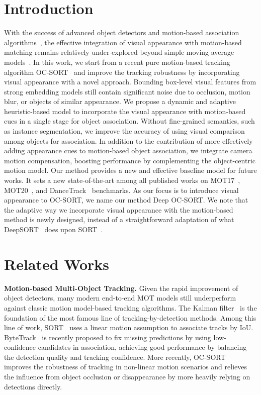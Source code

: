 \documentclass{article}
\begin{document}
\section{Introduction}
\label{sec:intro}
\vspace{-0.2cm}
With the success of advanced object detectors and motion-based association algorithms~\cite{bytetrack, cao2022observation, botsort}, the effective integration of visual appearance with motion-based matching remains relatively under-explored beyond simple moving average models~\cite{botsort, strongsort}. In this work, we start from a recent pure motion-based tracking algorithm OC-SORT~\cite{cao2022observation} and improve the tracking robustness by incorporating visual appearance with a novel approach. Bounding box-level visual features from strong embedding models still contain significant noise due to occlusion, motion blur, or objects of similar appearance. We propose a dynamic and adaptive heuristic-based model to incorporate the visual appearance with motion-based cues in a single stage for object association. Without fine-grained semantics, such as instance segmentation, we improve the accuracy of using visual comparison among objects for association. In addition to the contribution of more effectively adding appearance cues to motion-based object association, we integrate camera motion compensation, boosting performance by complementing the object-centric motion model. Our method provides a new and effective baseline model for future works. It sets a new state-of-the-art among all published works on MOT17~\cite{milan2016mot16}, MOT20~\cite{dendorfer2020mot20}, and DanceTrack~\cite{sun2021dancetrack} benchmarks. As our focus is to introduce visual appearance to OC-SORT, we name our method Deep OC-SORT. We note that the adaptive way we incorporate visual appearance with the motion-based method is newly designed, instead of a straightforward adaptation of what DeepSORT~\cite{deepsort} does upon SORT~\cite{bewley2016simple}.
\vspace{-0.3cm}


\section{Related Works}
\label{sec:related_works}
\vspace{-0.3cm}
\noindent \textbf{Motion-based Multi-Object Tracking.}
Given the rapid improvement of object detectors, many modern end-to-end MOT models still underperform against classic motion model-based tracking algorithms. The Kalman filter~\cite{kalman1960contributions} is the foundation of the most famous line of tracking-by-detection methods. Among this line of work, SORT~\cite{bewley2016simple} uses a linear motion assumption to associate tracks by IoU. ByteTrack~\cite{bytetrack} is recently proposed to fix missing predictions by using low-confidence candidates in association, achieving good performance by balancing the detection quality and tracking confidence. More recently, OC-SORT~\cite{cao2022observation} improves the robustness of tracking in non-linear motion scenarios and relieves the influence from object occlusion or disappearance by more heavily relying on detections directly. 
\end{document}
